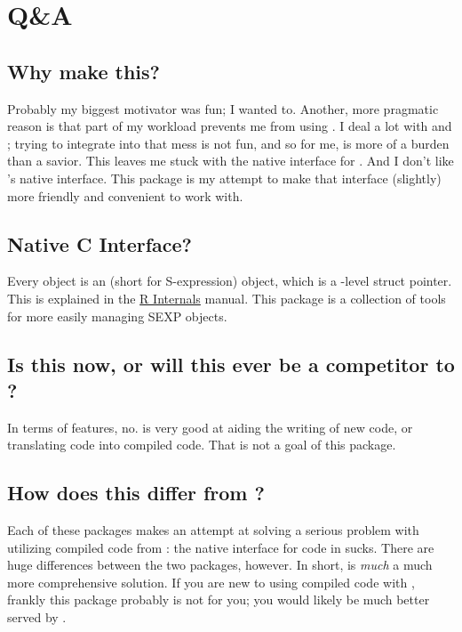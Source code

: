 \section{Q\&A}

\subsection{Why make this?}
Probably my biggest motivator was fun; I wanted to.  
Another, more pragmatic reason is that part of my workload prevents me from 
using .  I deal a lot with \C and \Fortran; trying to integrate \Cpp 
into that mess is not fun, and so for me,  is more of a burden than a 
savior.  This leaves me stuck with the native \C interface for \R.  And I don't 
like \R's native \C interface.  This package is my attempt to make that 
interface (slightly) more friendly and convenient to work with.


\subsection{Native C Interface?}
Every \R object is an  (short for S-expression) object, which is a 
\C-level struct pointer.  This is explained in the
\href{http://cran.r-project.org/doc/manuals/R-ints.html#SEXPs}{R Internals} 
manual.  This package is a collection of tools for more easily managing SEXP 
objects.


\subsection{Is this now, or will this ever be a competitor to ?}
In terms of features, no.   is very good at aiding the writing of
new code, or translating \R code into compiled code.  That is not a goal
of this package.


\subsection{How does this differ from ?}\label{sec:rcppdiffs}
Each of these packages makes an attempt at solving a serious problem with 
utilizing compiled code from \R: the native interface for  code in 
\R sucks.  There are huge differences between the two packages, however. In 
short,  is \emph{much} a much more comprehensive solution.  If you are 
new to using compiled code with \R, frankly this package probably is not for 
you; you would likely be much better served by .  

